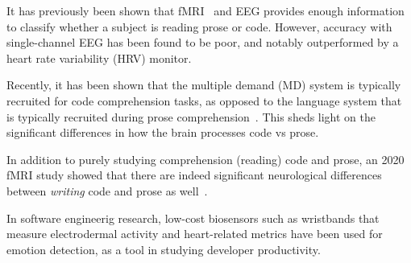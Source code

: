     It has previously been shown that fMRI~\cite{floyd_decoding_2017} and EEG\cite{fucci_replication_2019} provides enough information to classify whether a subject is reading prose or code. However, accuracy with single-channel EEG has been found to be poor, and notably outperformed by a heart rate variability (HRV) monitor.

    Recently, it has been shown that the multiple demand (MD) system is typically recruited for code comprehension tasks, as opposed to the language system that is typically recruited during prose comprehension~\cite{ivanova_comprehension_2020}. This sheds light on the significant differences in how the brain processes code vs prose.

    In addition to purely studying comprehension (reading) code and prose, an 2020 fMRI study showed that there are indeed significant neurological differences between \emph{writing} code and prose as well~\cite{noauthor_neurological_nodate}.

    In software engineerig research, low-cost biosensors such as wristbands that measure electrodermal activity and heart-related metrics have been used for emotion detection, as a tool in studying developer productivity.

